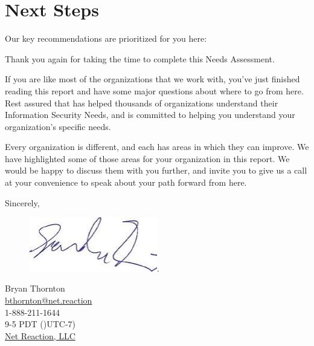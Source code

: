 \documentclass{needs}
\begin{document}
		\section{Next Steps}
		
		 Our key recommendations are prioritized for you here:
		\listSteps
		
		Thank you again for taking the time to complete this Needs Assessment. 
		
		If you are like most of the organizations that we work with, you’ve just finished reading this report and have some major questions about where to go from here.  Rest assured that \emph{\theauthor} has helped thousands of organizations understand their Information Security Needs, and is committed to helping you understand your organization’s specific needs.
		
		Every organization is different, and each has areas in which they can improve.  We have highlighted some of those areas for your organization in this report.  We would be happy to discuss them with you further, and invite you to give us a call at your convenience to speak about your path forward from here.
		
			Sincerely,
			
			\begin{figure}[h]
				\includegraphics[width = 0.5\textwidth]{sign}.
			\end{figure}
			Bryan Thornton \\
			\href{mailto:bthornton@net.reaction}{bthornton@net.reaction} \\
			1-888-211-1644 \\
			9-5 PDT ()UTC-7)\\
			\href{https://www.netreaction.com/}{Net Reaction, LLC}
					
\end{document}

